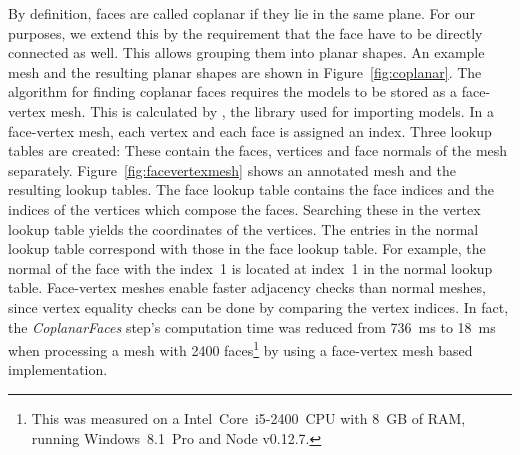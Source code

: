 \documentclass[../ClassicThesis.tex]{subfiles}
\begin{document}
By definition, faces are called coplanar if they lie in the same plane. For our purposes, we extend this by the requirement that the face have to be directly connected as well. This allows grouping them into planar shapes. An example mesh and the resulting planar shapes are shown in Figure~\ref{fig:coplanar}. The algorithm for finding coplanar faces requires the models to be stored as a face-vertex mesh. This is calculated by {\meshlib}, the library used for importing models. In a face-vertex mesh, each vertex and each face is assigned an index. Three lookup tables are created: These contain the faces, vertices and face normals of the mesh separately. Figure~\ref{fig:facevertexmesh} shows an annotated mesh and the resulting lookup tables. The face lookup table contains the face indices and the indices of the vertices which compose the faces. Searching these in the vertex lookup table yields the coordinates of the vertices. The entries in the normal lookup table correspond with those in the face lookup table. For example, the normal of the face with the index~1 is located at index~1 in the normal lookup table. Face-vertex meshes enable faster adjacency checks than normal meshes, since vertex equality checks can be done by comparing the vertex indices. In fact, the \emph{CoplanarFaces} step's computation time was reduced from 736~ms to 18~ms when processing a mesh with 2400 faces\footnote{This was measured on a Intel{\textregistered}~Core{\texttrademark}~i5-2400~CPU with 8~GB of RAM, running Windows~8.1~Pro and Node v0.12.7.} by using a face-vertex mesh based implementation.
\end{document}

